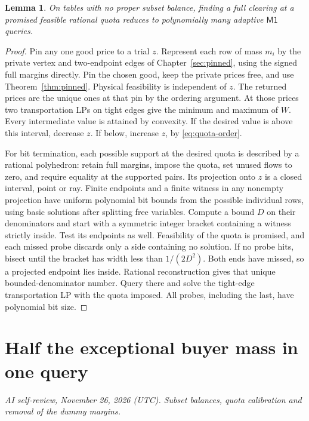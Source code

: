 \documentclass[11pt,oneside,openany,notitlepage]{report}
\newtheorem{lemma}[theorem]{Lemma}
\newcommand{\Market}{\mathsf{M1}}
\newcommand{\reviewdate}{November 26, 2026 (UTC)}
\newcommand{\reviewmark}[1]{\par\nopagebreak[4]\noindent
  {\footnotesize\itshape AI self-review, \reviewdate. #1\par}\nobreak\smallskip}
\begin{document}
\begin{lemma}\label{lem:quota-back}
On tables with no proper subset balance, finding a full clearing at a
promised feasible rational quota reduces to polynomially many adaptive
\(\Market\) queries.
\end{lemma}
\begin{proof}
Pin any one good price to a trial \(z\). Represent each row of mass
\(m_i\) by the private vertex and two-endpoint edges of
Chapter~\ref{sec:pinned}, using the signed full margins directly.
Pin the chosen good, keep the private prices free, and use
Theorem~\ref{thm:pinned}. Physical feasibility is independent of \(z\).
The returned prices are the unique ones at that pin by the ordering
argument. At those prices two transportation LPs on tight edges give
the minimum and maximum of \(W\). Every intermediate value is attained
by convexity. If the desired value is above this interval, decrease \(z\).
If below, increase \(z\), by \eqref{eq:quota-order}.

For bit termination, each possible support at the desired quota is
described by a rational polyhedron: retain full margins, impose the
quota, set unused flows to zero, and require equality at the supported
pairs. Its projection onto \(z\) is a closed interval, point or ray.
Finite endpoints and a finite witness in any nonempty projection have
uniform polynomial bit bounds from the possible individual rows, using
basic solutions after splitting free variables. Compute a bound \(D\) on
their denominators and start with a symmetric integer bracket containing
a witness strictly inside. Test its endpoints as well. Feasibility of the
quota is promised, and each missed probe discards only a side containing
no solution. If no probe hits, bisect until the bracket has width less
than \(1/(2D^2)\). Both ends have missed, so a projected endpoint lies
inside. Rational reconstruction gives that unique bounded-denominator
number. Query there and solve the tight-edge transportation LP with the
quota imposed. All probes, including the last, have polynomial bit size.
\end{proof}

\section{Half the exceptional buyer mass in one query}
\reviewmark{Subset balances, quota calibration and removal of the dummy margins.}
\end{document}
